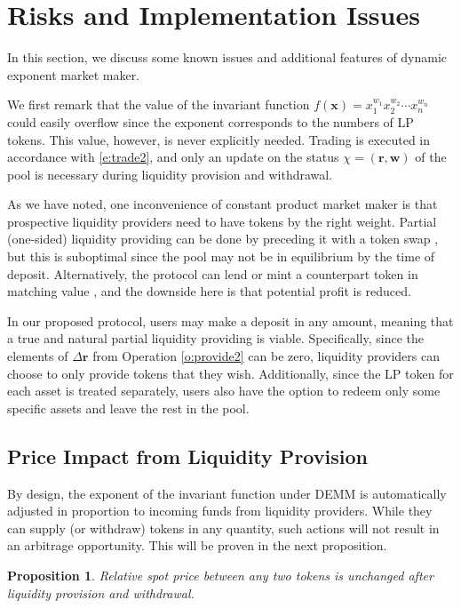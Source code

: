 \documentclass[12pt,a4paper]{article}
\newtheorem{proposition}[corollary]{Proposition}
\begin{document}
\section{Risks and Implementation Issues}

In this section, we discuss some known issues and additional features of dynamic exponent market maker.

We first remark that the value of the invariant function $f(\mathbf{x})=x_1^{w_1}x_2^{w_2}\cdots x_n^{w_n}$ could easily overflow since the exponent corresponds to the numbers of LP tokens. This value, however, is never explicitly needed. Trading is executed in accordance with \eqref{e:trade2}, and only an update on the status $\chi=(\mathbf{r},\mathbf{w})$ of the pool is necessary during liquidity provision and withdrawal.

As we have noted, one inconvenience of constant product market maker is that prospective liquidity providers need to have tokens by the right weight. Partial (one-sided) liquidity providing can be done by preceding it with a token swap \cite{MM}, but this is suboptimal since the pool may not be in equilibrium by the time of deposit. Alternatively, the protocol can lend or mint a counterpart token in matching value \cite{B1,B2,AF}, and the downside here is that potential profit is reduced.

In our proposed protocol, users may make a deposit in any amount, meaning that a true and natural partial liquidity providing is viable. Specifically, since the elements of $\Delta\mathbf{r}$ from Operation \ref{o:provide2} can be zero, liquidity providers can choose to only provide tokens that they wish. Additionally, since the LP token for each asset is treated separately, users also have the option to redeem only some specific assets and leave the rest in the pool.

\subsection{Price Impact from Liquidity Provision}

By design, the exponent of the invariant function under DEMM is automatically adjusted in proportion to incoming funds from liquidity providers. While they can supply (or withdraw) tokens in any quantity, such actions will not result in an arbitrage opportunity. This will be proven in the next proposition.

\begin{proposition}
Relative spot price between any two tokens is unchanged after liquidity provision and withdrawal.
\end{proposition}
\end{document}
